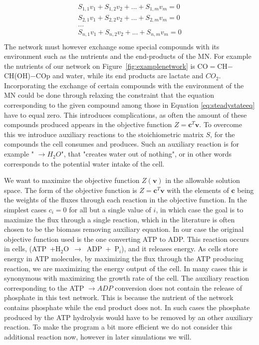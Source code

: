 \documentclass[a4paper,12pt]{article}
\begin{document}
	\begin{equation}\label{eq:steadystateeq}
		\begin{matrix}
			S_{1,1} v_1 + S_{1,2} v_2 + ... + S_{1,m} v_m=0 \\
			S_{2,1} v_1 + S_{2,2} v_2 + ... + S_{2,m} v_m=0 \\
			... \\
			S_{n,1} v_1 + S_{n,2} v_2 + ... + S_{n,m} v_m=0 \\
		\end{matrix}
	\end{equation}
	The network must however exchange some special compounds with its environment such as the nutrients and the end-products of the MN. For example the nutrients of our network on Figure~\ref {fig:examplenetwork} is CO$=$CH$-$CH(OH)$-$COp and water, while its end products are lactate and $CO_2$. Incorporating the exchange of certain compounds with the environment of the MN could be done through relaxing the constraint that the equation corresponding to the given compound among those in Equation \ref{eq:steadystateeq} have to equal zero. This introduces complications, as often the amount of these compounds produced appears in the objective function  $Z=\mathbf{c}^T \mathbf{v}$. To overcome this we introduce auxiliary reactions to the stoichiometric matrix $S$, for the compounds the cell consumes and produces. Such an auxiliary reaction is for example " $ \rightarrow H_2O$", that "creates water out of nothing", or in other words corresponds to the potential water intake of the cell.%


	We want to maximize the objective function $Z \left( \mathbf{v} \right)$ in the allowable solution space.   The form of the objective function is $Z=\mathbf{c}^T \mathbf{v}$ with the elements of $\mathbf{c}$ being the weights of the fluxes through each reaction in the objective function. In the simplest cases $c_i=0$ for all but a single value of $i$, in which case the goal is to maximize the flux through a single reaction, which in the literature is often chosen to be the biomass removing auxiliary equation\cite{whatisfluxbalance}. In our case the original objective function used is the one converting ATP to ADP. This reaction occurs in cells, (ATP~+H$_2$O~$\rightarrow$~ADP~+~P$_i$), and it releases energy. As cells store energy in ATP molecules,  by maximizing the flux through the ATP producing reaction, we are maximizing the energy output of the cell. In many cases this is synonymous with maximizing the growth rate of the cell. The auxiliary reaction corresponding to the ATP $\rightarrow ADP$ conversion does not contain the release of phosphate in this test network. This is because the nutrient of the network contains phosphate while the end product does not. In such cases the phosphate produced by the ATP hydrolysis would have to be removed by an other auxiliary reaction. To make the program a bit more efficient we do not consider this additional reaction now, however in later simulations we will. 
\end{document}
